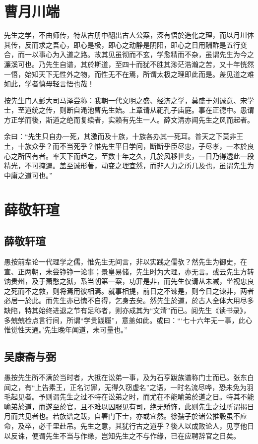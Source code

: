 \documentclass[
    title = 中文标题,
    author = 香饽饽,
    affiliation = 复旦大学,
    column = twocolumn,
    ref = refcn,
    lang = cn
]{spArticle}
\begin{document}
    \section{曹月川端}
    先生之学，不由师传，特从古册中翻出古人公案，深有悟於造化之理，而以月川体其传，反而求之吾心，即心是极，即心之动静是阴阳，即心之日用酬酢是五行变合，而一以事心为入道之路。故其见虽彻而不玄，学愈精而不杂，虽谓先生为今之濂溪可也。乃先生自谱，其於斯道，至四十而犹不胜其渺茫浩瀚之苦，又十年恍然一悟，始知天下无性外之物，而性无不在焉，所谓太极之理即此而是。盖见道之难如此，学者慎毋轻言悟也哉！

    按先生门人彭大司马泽尝称：我朝一代文明之盛、经济之学，莫盛于刘诚意、宋学士，至道统之传，则断自渑池曹先生始。上章请从祀孔子庙庭。事在正德中。愚谓方正学而後，斯道之绝而复续者，实赖有先生一人。薛文清亦闻先生之风而起者。

    余曰：“先生只自办一死，其激而及十族，十族各办其一死耳。普天之下莫非王土，十族众乎？而不当死乎？惟先生平日学问，断断乎臣尽忠，子尽孝，一本於良心之所固有者。率天下而趋之，至数十年之久，几於风移世变，一日乃得透此一段精光，不可掩遏。盖至诚形著，动变之理宜然，而非人力之所几及也，虽谓先生为中庸之道可也。”

    \section{薛敬轩瑄}
        \subsection{薛敬轩瑄}
            愚按前辈论一代理学之儒，惟先生无间言，非以实践之儒欤？然先生为御史，在宣、正两朝，未尝铮铮一论事；景皇易储，先生时为大理，亦无言。或云先生方转饷贵州，及于萧愍之狱，系当朝第一案，功罪是非，而先生仅请从未减，坐视忠良之死而不之救，则将焉用彼相焉。就事相提，前日之不谏是，则今日之谏非，两者必居一於此。而先生亦已愧不自得，乞身去矣。然先生於道，於古人全体大用尽多缺陷，特其始终进退之节有足称者，则亦成其为“文清”而已。阅先生《读书录》，多兢兢检点言行间，所谓“学贵践履”，意盖如此。或曰：“‘七十六年无一事，此心惟觉性天通。’先生晚年闻道，未可量也。”

        \subsection{吴康斋与弼}
            愚按先生所不满於当时者，大抵在讼弟一事，及为石亨跋族谱称门士而已。张东白闻之，有“上告素王，正名讨罪，无得久窃虚名”之语，一时名流尽哗，恐未免为羽毛起见者。予则谓先生之过不特在讼弟之时，而尤在不能喻弟於道之日。特其不能喻弟於道，而遂至於官，且不难以囚服见有司，绝无矫饰，此则先生之过所谓揭日月而共见者也。若族谱之跋，自署门下士，亦或宜然。徐孺子於诸公推毂虽不应命，及卒，必千里赴吊。先生之意，其犹行古之道乎？後人以成败论人，见亨他日以反诛，便谓先生不当与作缘，岂知先生之不与作缘，已在应聘辞官之日矣。
\end{document}
